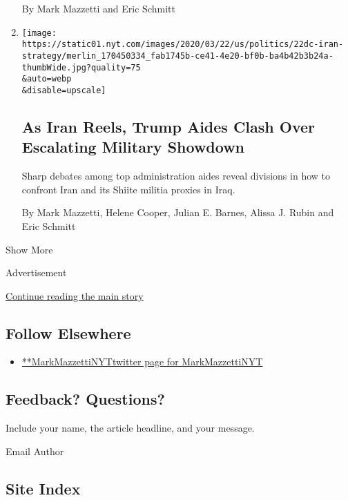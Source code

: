 \begin{enumerate}
  By Mark Mazzetti and Eric Schmitt
\item
  \href{/2020/03/21/world/middleeast/trump-iran-iraq-coronavirus-militas.html}{}

  \texttt{[image: https://static01.nyt.com/images/2020/03/22/us/politics/22dc-iran-strategy/merlin\_170450334\_fab1745b-ce41-4e20-bf0b-ba4b42b3b24a-thumbWide.jpg?quality=75\\\&auto=webp\\\&disable=upscale]}

  \hypertarget{as-iran-reels-trump-aides-clash-over-escalating-military-showdown}{%
  \subsection{As Iran Reels, Trump Aides Clash Over Escalating Military
  Showdown}\label{as-iran-reels-trump-aides-clash-over-escalating-military-showdown}}

  Sharp debates among top administration aides reveal divisions in how
  to confront Iran and its Shiite militia proxies in Iraq.

  By Mark Mazzetti, Helene Cooper, Julian E. Barnes, Alissa J. Rubin and
  Eric Schmitt
\end{enumerate}

Show More

Advertisement

\protect\hyperlink{after-mid2}{Continue reading the main story}

\hypertarget{follow-elsewhere}{%
\subsection{Follow Elsewhere}\label{follow-elsewhere}}

\begin{itemize}
\tightlist
\item
  \href{https://twitter.com/MarkMazzettiNYT}{**MarkMazzettiNYTtwitter
  page for MarkMazzettiNYT}
\end{itemize}

\hypertarget{feedback-questions}{%
\subsection{Feedback? Questions?}\label{feedback-questions}}

Include your name, the article headline, and your message.

Email Author

\hypertarget{site-index}{%
\subsection{Site Index}\label{site-index}}


